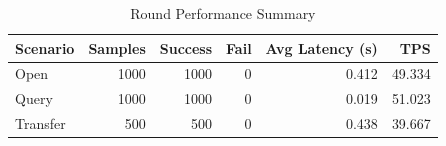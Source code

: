 \begin{table}
\caption{Round Performance Summary}
\label{tab:round_perf}
\begin{tabular}{lrrrrr}
\toprule
Scenario & Samples & Success & Fail & Avg Latency (s) & TPS \\
\midrule
Open & 1000 & 1000 & 0 & 0.412 & 49.334 \\
Query & 1000 & 1000 & 0 & 0.019 & 51.023 \\
Transfer & 500 & 500 & 0 & 0.438 & 39.667 \\
\bottomrule
\end{tabular}
\end{table}
